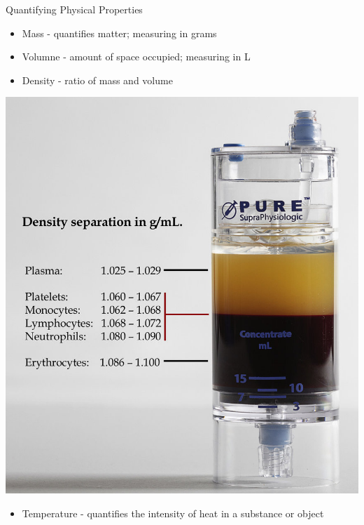 \documentclass[11pt]{beamer}
\begin{document}
\begin{frame}{Quantifying Physical Properties}
  \begin{itemize}
  \item Mass - quantifies matter; measuring in grams
  \item Volumne - amount of space occupied; measuring in L
  \item Density - ratio of mass and volume
  \end{itemize}
  \centering
  \includegraphics[scale=0.14]{dens_liquids}
  \begin{itemize}
  \item Temperature - quantifies the intensity of heat in a substance
    or object
  \end{itemize}
\end{frame}
\end{document}
